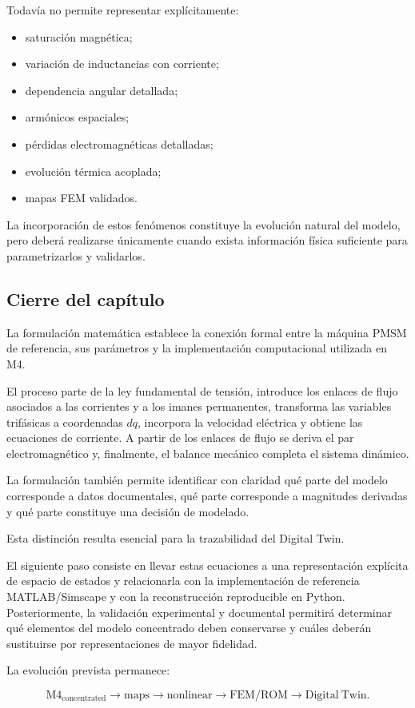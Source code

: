 Todavía no permite representar explícitamente:

\begin{itemize}
    \item saturación magnética;
    \item variación de inductancias con corriente;
    \item dependencia angular detallada;
    \item armónicos espaciales;
    \item pérdidas electromagnéticas detalladas;
    \item evolución térmica acoplada;
    \item mapas FEM validados.
\end{itemize}

La incorporación de estos fenómenos constituye la evolución natural del modelo, pero deberá realizarse únicamente cuando exista información física suficiente para parametrizarlos y validarlos.

\subsection{Cierre del capítulo}

La formulación matemática establece la conexión formal entre la máquina PMSM de referencia, sus parámetros y la implementación computacional utilizada en M4.

El proceso parte de la ley fundamental de tensión, introduce los enlaces de flujo asociados a las corrientes y a los imanes permanentes, transforma las variables trifásicas a coordenadas $dq$, incorpora la velocidad eléctrica y obtiene las ecuaciones de corriente. A partir de los enlaces de flujo se deriva el par electromagnético y, finalmente, el balance mecánico completa el sistema dinámico.

La formulación también permite identificar con claridad qué parte del modelo corresponde a datos documentales, qué parte corresponde a magnitudes derivadas y qué parte constituye una decisión de modelado.

Esta distinción resulta esencial para la trazabilidad del Digital Twin.

El siguiente paso consiste en llevar estas ecuaciones a una representación explícita de espacio de estados y relacionarla con la implementación de referencia MATLAB/Simscape y con la reconstrucción reproducible en Python. Posteriormente, la validación experimental y documental permitirá determinar qué elementos del modelo concentrado deben conservarse y cuáles deberán sustituirse por representaciones de mayor fidelidad.

La evolución prevista permanece:

\begin{equation}
\mathrm{M4}_{\mathrm{concentrated}}
\rightarrow
\mathrm{maps}
\rightarrow
\mathrm{nonlinear}
\rightarrow
\mathrm{FEM/ROM}
\rightarrow
\mathrm{Digital\ Twin}.
\end{equation}
